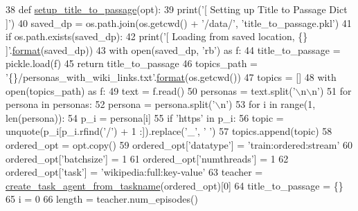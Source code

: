 \begin{DoxyCode}
38 \textcolor{keyword}{def }\hyperlink{namespaceparlai_1_1mturk_1_1tasks_1_1wizard__of__wikipedia_1_1run_a59836c3be93d4b491fa9ddecbb4e83c0}{setup\_title\_to\_passage}(opt):
39     print(\textcolor{stringliteral}{'[ Setting up Title to Passage Dict ]'})
40     saved\_dp = os.path.join(os.getcwd() + \textcolor{stringliteral}{'/data/'}, \textcolor{stringliteral}{'title\_to\_passage.pkl'})
41     \textcolor{keywordflow}{if} os.path.exists(saved\_dp):
42         print(\textcolor{stringliteral}{'[ Loading from saved location, \{\} ]'}.\hyperlink{namespaceparlai_1_1chat__service_1_1services_1_1messenger_1_1shared__utils_a32e2e2022b824fbaf80c747160b52a76}{format}(saved\_dp))
43         with open(saved\_dp, \textcolor{stringliteral}{'rb'}) \textcolor{keyword}{as} f:
44             title\_to\_passage = pickle.load(f)
45             \textcolor{keywordflow}{return} title\_to\_passage
46     topics\_path = \textcolor{stringliteral}{'\{\}/personas\_with\_wiki\_links.txt'}.\hyperlink{namespaceparlai_1_1chat__service_1_1services_1_1messenger_1_1shared__utils_a32e2e2022b824fbaf80c747160b52a76}{format}(os.getcwd())
47     topics = []
48     with open(topics\_path) \textcolor{keyword}{as} f:
49         text = f.read()
50         personas = text.split(\textcolor{stringliteral}{'\(\backslash\)n\(\backslash\)n'})
51         \textcolor{keywordflow}{for} persona \textcolor{keywordflow}{in} personas:
52             persona = persona.split(\textcolor{stringliteral}{'\(\backslash\)n'})
53             \textcolor{keywordflow}{for} i \textcolor{keywordflow}{in} range(1, len(persona)):
54                 p\_i = persona[i]
55                 \textcolor{keywordflow}{if} \textcolor{stringliteral}{'https'} \textcolor{keywordflow}{in} p\_i:
56                     topic = unquote(p\_i[p\_i.rfind(\textcolor{stringliteral}{'/'}) + 1 :]).replace(\textcolor{stringliteral}{'\_'}, \textcolor{stringliteral}{' '})
57                     topics.append(topic)
58     ordered\_opt = opt.copy()
59     ordered\_opt[\textcolor{stringliteral}{'datatype'}] = \textcolor{stringliteral}{'train:ordered:stream'}
60     ordered\_opt[\textcolor{stringliteral}{'batchsize'}] = 1
61     ordered\_opt[\textcolor{stringliteral}{'numthreads'}] = 1
62     ordered\_opt[\textcolor{stringliteral}{'task'}] = \textcolor{stringliteral}{'wikipedia:full:key-value'}
63     teacher = \hyperlink{namespaceparlai_1_1core_1_1agents_a76269fb567532a8fb7f29edcc20a6e47}{create\_task\_agent\_from\_taskname}(ordered\_opt)[0]
64     title\_to\_passage = \{\}
65     i = 0
66     length = teacher.num\_episodes()

\end{DoxyCode}
